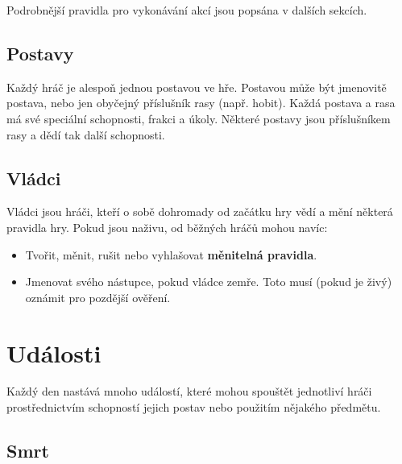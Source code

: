\documentclass[11pt]{article} %
\newcommand{\albert}{\Nursey[][yellow][blue][red]}
\begin{document}
Podrobnější pravidla pro vykonávání akcí jsou popsána v dalších sekcích.

\subsection{Postavy}

Každý hráč je alespoň jednou postavou ve hře.
Postavou může být jmenovitě postava, nebo jen obyčejný příslušník rasy (např. hobit).
Každá postava a rasa má své speciální schopnosti, frakci a úkoly.
Některé postavy jsou příslušníkem rasy a dědí tak další schopnosti.

\subsection{Vládci}

Vládci jsou hráči, kteří o sobě dohromady od začátku hry vědí a mění některá pravidla hry.
Pokud jsou naživu, od běžných hráčů mohou navíc:
\begin{itemize}
    \item Tvořit, měnit, rušit nebo vyhlašovat \textbf{měnitelná pravidla}.
    \item Jmenovat svého nástupce, pokud vládce zemře. Toto musí (pokud je živý) oznámit \albert pro pozdější ověření.
\end{itemize}

\section{Události}

Každý den nastává mnoho událostí, které mohou spouštět jednotliví hráči prostřednictvím schopností jejich postav nebo použitím nějakého předmětu.  

\subsection{Smrt}
\end{document}
